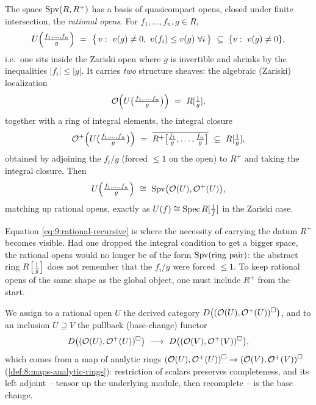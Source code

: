 \begin{definition}
\label{def:9:rational-open}
The space $\operatorname{Spv}(R,R^{+})$ has a basis of quasicompact opens, closed under finite
intersection, the \emph{rational opens}. For $f_{1},\dots,f_{n},g\in R$,
\begin{equation*}
U\Bigl(\tfrac{f_{1},\dots,f_{n}}{g}\Bigr)\ =\ \bigl\{\,v:\ v(g)\neq 0,\ v(f_{i})\le
v(g)\ \forall i\,\bigr\}\ \subseteq\ \{v:\ v(g)\neq 0\},
\end{equation*}
i.e.\ one sits inside the Zariski open where $g$ is invertible and shrinks by the
inequalities $|f_{i}|\le|g|$. It carries \emph{two} structure sheaves: the
algebraic (Zariski) localization
\begin{equation*}
\mathcal O\Bigl(U\bigl(\tfrac{f_{1},\dots,f_{n}}{g}\bigr)\Bigr)\ =\ R[\tfrac1g],
\end{equation*}
together with a ring of integral elements, the integral closure
\begin{equation*}
\mathcal O^{+}\Bigl(U\bigl(\tfrac{f_{1},\dots,f_{n}}{g}\bigr)\Bigr)\ =\
\overline{R^{+}\bigl[\tfrac{f_{1}}{g},\dots,\tfrac{f_{n}}{g}\bigr]}\ \subseteq\
R[\tfrac1g],
\end{equation*}
obtained by adjoining the $f_{i}/g$ (forced $\le 1$ on the open) to $R^{+}$ and
taking the integral closure. Then
\begin{equation}
\label{eq:9:rational-recursive}
U\Bigl(\tfrac{f_{1},\dots,f_{n}}{g}\Bigr)\ \cong\ \operatorname{Spv}\bigl(\mathcal O(U),
\mathcal O^{+}(U)\bigr),
\end{equation}
matching up rational opens, exactly as $U(f)\cong\operatorname{Spec} R[\tfrac1f]$ in the
Zariski case.
\end{definition}

\begin{remark}
\label{rmk:9:why-Rplus}
Equation \eqref{eq:9:rational-recursive} is where the necessity of carrying the
datum $R^{+}$ becomes visible. Had one dropped the integral condition to get a
bigger space, the rational opens would no longer be of the form
$\operatorname{Spv}(\text{ring pair})$: the abstract ring $R[\tfrac1g]$ does not remember that
the $f_{i}/g$ were forced $\le 1$. To keep rational opens of the same shape as
the global object, one must include $R^{+}$ from the start.
\end{remark}

We assign to a rational open $U$ the derived category $D\bigl((\mathcal O(U),
\mathcal O^{+}(U))^{\square}\bigr)$, and to an inclusion $U\supseteq V$ the
pullback (base-change) functor
\begin{equation}
\label{eq:9:pullback-functor}
D\bigl((\mathcal O(U),\mathcal O^{+}(U))^{\solid}\bigr)\ \longrightarrow\
D\bigl((\mathcal O(V),\mathcal O^{+}(V))^{\solid}\bigr),
\end{equation}
which comes from a map of analytic rings $(\mathcal O(U),\mathcal O^{+}(U))^{
\square}\to(\mathcal O(V),\mathcal O^{+}(V))^{\square}$ (\cref{def:8:maps-analytic-rings}):
restriction of scalars preserves completeness, and its left adjoint -- tensor
up the underlying module, then recomplete -- is the base change.

